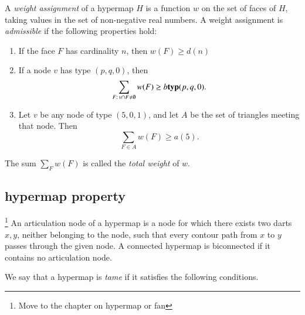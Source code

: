 \begin{definition}
%
A {\it weight assignment\/} of a hypermap $H$ is a function $w$ on
the set of faces of $H$, taking values in the set of non-negative
real numbers. A weight assignment is {\it admissible} if the
following properties hold:
%
\begin{enumerate}
  \item If the face $F$ has cardinality $n$, then
        $w(F) \ge d(n)$
  \item If a node $v$ has type $(p,q,0)$, then
        $$\sum_{F:\,v\cap F\ne\emptyset} w(F) \ge b{{\operatorname{\bf typ}}{(p,q,0)}}.$$
        \label{admissible:b}
  \item Let $v$ be any node of type $(5,0,1)$, and let $A$ be the set of
triangles meeting that node.
        Then
        $$\sum_{F\in A} w(F)
            \ge  a(5).$$
        \label{definition:admissible:excess}
\end{enumerate}
The sum $\sum_F w(F)$ is called the {\it total weight} of $w$.
\end{definition}





\subsection{hypermap property}
\label{sec:graphproperty}

\begin{definition}\footnote{Move to the chapter
on hypermap or fan}
An articulation node of a hypermap is a node for which
there exists two darts $x,y$, 
neither belonging to the node,
such that every contour path from $x$ to $y$ passes
through the given node.
A connected hypermap is biconnected
if it contains no articulation node.  
\end{definition}


We say that a hypermap is {\it tame\/} if it satisfies the following
conditions.
%

